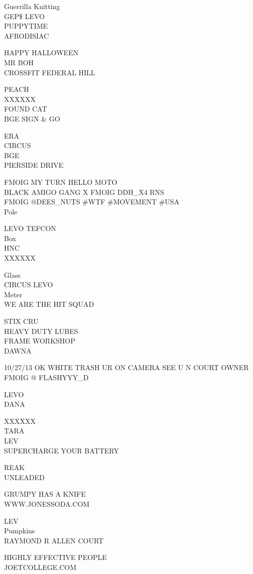 \documentclass[10pt,letterpaper]{article}
\begin{document}
Guerrilla Knitting\\
GEP\$ LEVO\\
PUPPYTIME\\
AFRODISIAC

HAPPY HALLOWEEN\\
MR BOH\\
CROSSFIT FEDERAL HILL

PEACH\\
XXXXXX\\
FOUND CAT\\
BGE SIGN \& GO

ERA\\
CIRCUS\\
BGE\\
PIERSIDE DRIVE

FMOIG MY TURN HELLO MOTO\\
BLACK AMIGO GANG X FMOIG DDH\_X4 RNS\\
FMOIG @DEES\_NUTS \#WTF \#MOVEMENT \#USA\\
Pole

LEVO TEFCON\\
Box\\
HNC\\
XXXXXX

Glass\\
CIRCUS LEVO\\
Meter\\
WE ARE THE HIT SQUAD

STIX CRU\\
HEAVY DUTY LUBES\\
FRAME WORKSHOP\\
DAWNA

10/27/13 OK WHITE TRASH UR ON CAMERA SEE U N COURT OWNER\\
FMOIG @ FLASHYYY\_D

LEVO\\
DANA

XXXXXX\\
TARA\\
LEV\\
SUPERCHARGE YOUR BATTERY

REAK\\
UNLEADED

GRUMPY HAS A KNIFE\\
WWW.JONESSODA.COM

LEV\\
Pumpkins\\
RAYMOND R ALLEN COURT

HIGHLY EFFECTIVE PEOPLE\\
JOETCOLLEGE.COM
\end{document}
